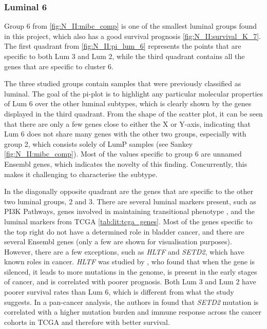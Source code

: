 \subsubsection*{Luminal 6} \label{s:N_II:lum_6}

Group 6 from \cref{fig:N_II:mibc_comp} is one of the smallest luminal groups found in this project, which also has a good survival prognosis \cref{fig:N_II:survival_K_7}. The first quadrant from \cref{fig:N_II:pi_lum_6}  represents the points that are specific to both Lum 3 and Lum 2, while the third quadrant contains all the genes that are specific to cluster 6. 

The three studied groups contain samples that were previously classified as luminal. The goal of the pi-plot is to highlight any particular molecular properties of Lum 6 over the other luminal subtypes, which is clearly shown by the genes displayed in the third quadrant. From the shape of the scatter plot, it can be seen that there are only a few genes close to either the X or Y-axis, indicating that Lum 6 does not share many genes with the other two groups, especially with group 2, which consists solely of LumP samples (see Sankey \cref{fig:N_II:mibc_comp}). Most of the values specific to group 6 are unnamed Ensembl genes, which indicates the novelty of this finding. Concurrently, this makes it challenging to characterise the subtype.

In the diagonally opposite quadrant are the genes that are specific to the other two luminal groups, 2 and 3. There are several luminal markers present, such as PI3K Pathways, genes involved in maintaining transitional phenotype \citep{Hurst2022-sp}, and the luminal markers from TCGA \cref{tab:lit:tcga_genes}. Most of the genes specific to the top right do not have a determined role in bladder cancer, and there are several Ensembl genes (only a few are shown for visualisation purposes). However, there are a few exceptions, such as \textit{HLTF} and \textit{SETD2}, which have known roles in cancer. \textit{HLTF} was studied by \citep{Dhont2016-vf}, who found that when the gene is silenced, it leads to more mutations in the genome, is present in the early stages of cancer, and is correlated with poorer prognosis. Both Lum 3 and Lum 2 have poorer survival rates than Lum 6, which is different from what the study suggests. In a pan-cancer analysis, the authors in \citep{Lu2021-jt} found that \textit{SETD2} mutation is correlated with a higher mutation burden and immune response across the cancer cohorts in TCGA and therefore with better survival.

